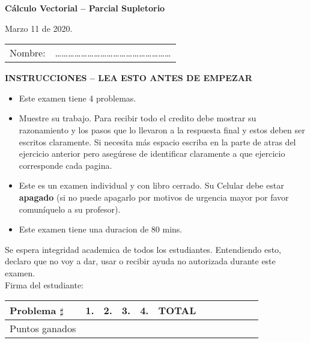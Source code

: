 \documentclass[12pt]{article}
\begin{document}
\begin{center}
\begin{Large}
{\bf C\'alculo Vectorial -- Parcial Supletorio}\\ 
\end{Large}
{Marzo 11 de 2020.}
\bigskip
\\
\begin{tabular}{ll}
Nombre: & \dots\dots\dots\dots\dots\dots\dots\dots\dots\dots\dots\dots\dots\dots\dots\dots\dots\dots\\
\end{tabular}
\bigskip

\begin{large}

\bigskip
{\bf INSTRUCCIONES -- LEA ESTO ANTES DE EMPEZAR}
\end{large}
\end{center}
\begin{itemize}
\item{ Este examen tiene 4 problemas.}
\item{Muestre su trabajo. Para recibir todo el credito debe mostrar su razonamiento y los pasos que lo llevaron a la respuesta final y estos deben ser escritos claramente. Si necesita m\'as espacio escriba en la parte de atras del ejercicio anterior pero aseg\'urese de identificar claramente a que ejercicio corresponde cada pagina.}
\item{Este es un examen individual y con libro cerrado. Su Celular debe estar {\bf apagado} (si no puede apagarlo por motivos de urgencia mayor por favor comun\'iquelo a su profesor).}

\item{Este examen tiene una duracion de 80 mins.}
\end{itemize}
Se espera integridad academica de todos los estudiantes. Entendiendo esto, declaro que no voy a dar, usar o recibir ayuda no autorizada durante este examen.\\
\bigskip
\bigskip
\bigskip
\noindent Firma del estudiante:\\
\hline
\begin{center}
\begin{large}
\bigskip 
\begin{tabular}{|l|c|c|c|c|c|c|c|c|c|c|c}
\hline
Problema $\sharp$ & 1. & 2. & 3. & 4. & TOTAL\\
\hline
Puntos ganados & & & & &\\
\hline 
\end{tabular}
\end{large}
\end{center}
\newpage
\end{document}
